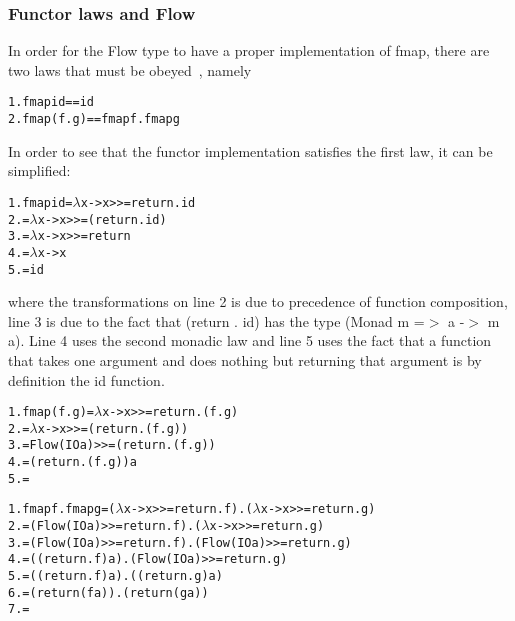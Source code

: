 \subsubsection{Functor laws and Flow}
In order for the Flow type to have a proper implementation of fmap, there are two laws that must be obeyed~\cite{functor-laws}, namely
\begin{alltt}
  1.  fmap id  ==  id
  2.  fmap (f . g)  ==  fmap f . fmap g
\end{alltt}
In order to see that the functor implementation satisfies the first law, it can be simplified:
\begin{alltt}
  1. fmap id = \(\lambda\)x -> x >>= return . id
  2.         = \(\lambda\)x -> x >>= (return . id)
  3.         = \(\lambda\)x -> x >>= return
  4.         = \(\lambda\)x -> x
  5.         = id
\end{alltt}
where the transformations on line 2 is due to precedence of function composition, line 3 is due to the fact that (return . id) has the type (Monad m =\(>\) a -\(>\) m a). Line 4 uses the second monadic law and line 5 uses the fact that a function that takes one argument and does nothing but returning that argument is by definition the id function.

\begin{alltt}
  1. fmap (f . g) = \(\lambda\)x -> x >>= return . (f . g)
  2.              = \(\lambda\)x -> x >>= (return . (f . g))
  3.              = Flow (IO a) >>= (return . (f . g))
  4.              = (return . (f . g)) a
  5.              = 
\end{alltt}

\begin{alltt}
  1. fmap f . fmap g = (\(\lambda\)x -> x >>= return . f) . (\(\lambda\)x -> x >>= return . g)
  2.                 = (Flow (IO a) >>= return . f) . (\(\lambda\)x -> x >>= return . g)
  3.                 = (Flow (IO a) >>= return . f) . (Flow (IO a) >>= return . g)
  4.                 = ((return . f) a) . (Flow (IO a) >>= return . g)
  5.                 = ((return . f) a) . ((return . g) a)
  6.                 = (return (f a)) . (return (g a))
  7.                 = 
\end{alltt}
